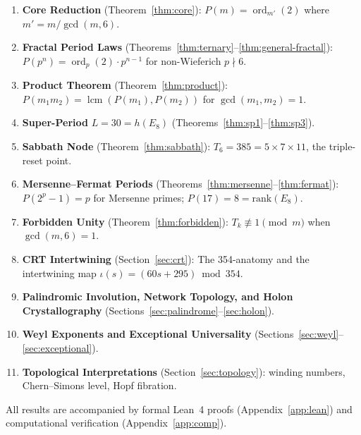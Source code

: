 \documentclass[11pt, a4paper]{article}
\theoremstyle{plain}
\theoremstyle{definition}
\theoremstyle{remark}
\newcommand{\ord}{\operatorname{ord}}
\DeclareMathOperator{\lcm}{lcm}
\begin{document}
\begin{enumerate}
  \item \textbf{Core Reduction} (Theorem~\ref{thm:core}): $P(m) =
    \ord_{m'}(2)$ where $m' = m/\gcd(m,6)$.

  \item \textbf{Fractal Period Laws}
    (Theorems~\ref{thm:ternary}--\ref{thm:general-fractal}):
    $P(p^n) = \ord_p(2) \cdot p^{n-1}$ for non-Wieferich $p \nmid 6$.

  \item \textbf{Product Theorem} (Theorem~\ref{thm:product}):
    $P(m_1 m_2) = \lcm(P(m_1), P(m_2))$ for $\gcd(m_1, m_2) = 1$.

  \item \textbf{Super-Period} $L = 30 = h(E_8)$
    (Theorems~\ref{thm:sp1}--\ref{thm:sp3}).

  \item \textbf{Sabbath Node} (Theorem~\ref{thm:sabbath}):
    $T_6 = 385 = 5 \times 7 \times 11$, the triple-reset point.

  \item \textbf{Mersenne--Fermat Periods}
    (Theorems~\ref{thm:mersenne}--\ref{thm:fermat}):
    $P(2^p - 1) = p$ for Mersenne primes; $P(17) = 8 = \mathrm{rank}(E_8)$.

  \item \textbf{Forbidden Unity} (Theorem~\ref{thm:forbidden}):
    $T_k \not\equiv 1 \pmod{m}$ when $\gcd(m,6) = 1$.

  \item \textbf{CRT Intertwining} (Section~\ref{sec:crt}):
    The 354-anatomy and the intertwining map
    $\iota(s) = (60s + 295) \bmod 354$.

  \item \textbf{Palindromic Involution, Network Topology, and
    Holon Crystallography}
    (Sections~\ref{sec:palindrome}--\ref{sec:holon}).

  \item \textbf{Weyl Exponents and Exceptional Universality}
    (Sections~\ref{sec:weyl}--\ref{sec:exceptional}).

  \item \textbf{Topological Interpretations}
    (Section~\ref{sec:topology}): winding numbers, Chern--Simons level,
    Hopf fibration.
\end{enumerate}

All results are accompanied by formal Lean~4 proofs
(Appendix~\ref{app:lean}) and computational verification
(Appendix~\ref{app:comp}).
\end{document}
